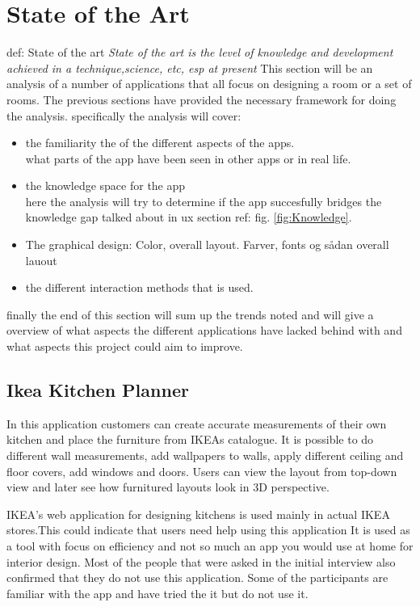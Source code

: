 \section{State of the Art }
def: State of the art
\textit{ State of the art is the level of knowledge and development achieved in a technique,science, etc, esp at present }
\newline
This section will be an analysis of a number of applications that all focus on designing a room or a set of rooms. The previous sections have provided the necessary framework for doing the analysis. specifically the analysis will cover:

\begin{itemize}
\item the familiarity the of the different aspects of the apps.\\
what parts of the app have been seen in other apps or in real life. 
\item the knowledge space for the app\\
here the analysis will try to determine if the app succesfully bridges the knowledge gap talked about in ux section ref: fig. \ref{fig:Knowledge}.
\item The graphical design: Color, overall layout. Farver, fonts og sådan overall lauout
\item the different interaction methods that is used. 
\end{itemize}
 finally the end of this section will sum up the trends noted and will give a overview of what aspects the different applications have lacked behind with and what aspects this project could aim to improve. 

\subsection{Ikea Kitchen Planner}
In this application customers can create accurate measurements of their own kitchen and place the furniture from IKEAs catalogue. It is possible to do different wall measurements, add wallpapers to walls, apply different ceiling and floor covers, add windows and doors. Users can view the layout from top-down view and later see how furnitured layouts look in 3D perspective.

IKEA’s web application for designing kitchens is used mainly in actual IKEA stores.This could indicate that users need help using this application It is used as a tool with focus on efficiency and not so much an app you would use at home for interior design. Most of the people that were asked in the initial interview also confirmed that they do not use this application. Some of the participants are familiar with the app and have tried the it but do not use it. 

